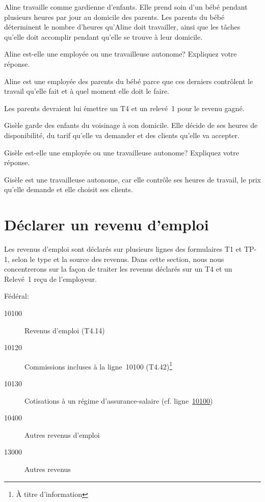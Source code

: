 \begin{question}
	Aline travaille comme gardienne d'enfants. Elle prend soin d'un bébé pendant plusieurs heures par jour au domicile des parents. Les parents du bébé déterminent le nombre d'heures qu'Aline doit travailler, ainsi que les tâches qu'elle doit accomplir pendant qu'elle se trouve à leur domicile. 
	
	Aline est-elle une employée ou une travailleuse autonome? Expliquez votre réponse.
\end{question}
Aline est une employée des parents du bébé parce que ces derniers contrôlent le travail qu'elle fait et à quel moment elle doit le faire.

Les parents devraient lui émettre un T4 et un relevé~1 pour le revenu gagné.

\begin{question}
	Gisèle garde des enfants du voisinage à son domicile. Elle décide de ses heures de disponibilité, du tarif qu'elle va demander et des clients qu'elle va accepter. 
	
	Gisèle est-elle une employée ou une travailleuse autonome? 
	Expliquez votre réponse.
\end{question}
Gisèle est une travailleuse autonome, car elle contrôle ses heures de travail, le prix qu'elle demande et elle choisit ses clients.



\section{Déclarer un revenu d'emploi}
\begin{intro}
	Les revenus d'emploi sont déclarés sur plusieurs lignes des formulaires T1 et TP-1, selon le type et la source des revenus. Dans cette section, nous nous concentrerons sur la façon de traiter les revenus déclarés sur un T4 et un Relevé~1 reçu de l'employeur.
\end{intro}
Fédéral:
\ca
\begin{description}
	\item[10100] Revenus d'emploi (T4.14)
	\item[10120] Commissions incluses à la ligne~10100 (T4.42)\footnote{\label{ATitreDInformation}À titre d'information}
	\item[10130] Cotisations à un régime d'assurance-salaire (cf. ligne~\href{https://www.canada.ca/fr/agence-revenu/services/impot/particuliers/sujets/tout-votre-declaration-revenus/declaration-revenus/remplir-declaration-revenus/revenu-personnel/ligne-10100-revenus-emploi.html}{10100})
	\item[10400] Autres revenus d'emploi
	\item[13000] Autres revenus
\end{description}

